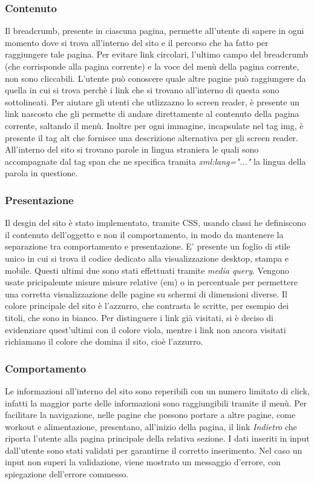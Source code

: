 \subsubsection{Contenuto}
Il breadcrumb, presente in ciascuna pagina, permette all'utente di sapere in ogni momento dove si trova all'interno del sito e il percorso che ha fatto per raggiungere tale pagina. Per evitare link circolari, l'ultimo campo del breadcrumb (che corrisponde alla pagina corrente) e la voce del menù della pagina corrente, non sono cliccabili. L'utente può conoscere quale altre pagine può raggiungere da quella in cui si trova perchè i link che si trovano all'interno di questa sono sottolineati. 
Per aiutare gli utenti che utlizzazno lo screen reader, è presente un link nascosto che gli permette di andare direttamente al contenuto della pagina corrente, saltando il menù. Inoltre per ogni immagine, incapsulate nel tag img, è presente il tag alt che fornisce una  descrizione alternativa per gli screen reader. 
All'interno del sito si trovano parole in lingua straniera le quali sono accompagnate dal tag span che ne specifica tramita \textit{xml:lang="..."} la lingua della parola in questione. 


\subsubsection{Presentazione}
Il desgin del sito è stato implementato, tramite CSS, usando classi he definiscono il contenuto
dell’oggetto e non il comportamento, in modo da mantenere la separazione tra comportamento e presentazione. E' presente un foglio di stile unico in cui si trova il codice dedicato alla visualizzazione desktop, stampa e mobile. Questi ultimi due sono stati effettuati tramite \textit{media query}. Vengono usate pricipalemte misure  misure relative (em) o in percentuale per permettere una corretta visualizzazione delle pagine su schermi di dimensioni diverse. 
Il colore principale del sito è l'azzurro, che contrasta le scritte, per esempio dei titoli, che sono in bianco. Per distinguere i link già visitati, si è deciso di evidenziare quest'ultimi con il colore viola, mentre i link non ancora visitati richiamano il colore che domina il sito, cioè l'azzurro. 


\subsubsection{Comportamento}
Le informazioni all'interno del sito sono reperibili con un numero
limitato di click, infatti la maggior parte delle informazioni sono raggiungibili tramite il menù. 
Per facilitare la navigazione, nelle pagine che possono portare a altre pagine, come workout e alimentazione, presentano, all'inizio della pagina, il link \textit{Indietro} che riporta l'utente alla pagina principale della relativa sezione. 
I dati inseriti in input dall'utente sono stati validati per garantirne il corretto inserimento. Nel caso un input non superi la validazione, viene mostrato un messaggio d'errore, con spiegazione dell’errore commesso.

